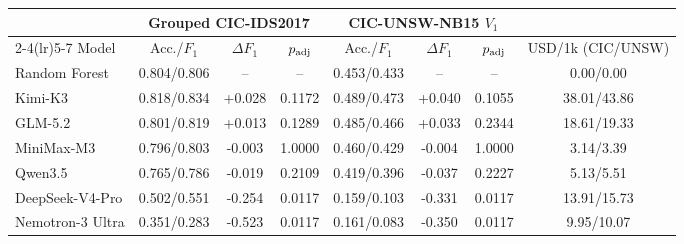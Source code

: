 \begin{tabular}{@{}lccccccc@{}}
\toprule
& \multicolumn{3}{c}{Grouped CIC-IDS2017} & \multicolumn{3}{c}{CIC-UNSW-NB15 $V_1$} & \\
\cmidrule(lr){2-4}\cmidrule(lr){5-7}
Model & Acc./$F_1$ & $\Delta F_1$ & $p_{\rm adj}$ & Acc./$F_1$ & $\Delta F_1$ & $p_{\rm adj}$ & USD/1k (CIC/UNSW) \\
\midrule
Random Forest & 0.804/0.806 & -- & -- & 0.453/0.433 & -- & -- & 0.00/0.00 \\
Kimi-K3 & 0.818/0.834 & +0.028 & 0.1172 & 0.489/0.473 & +0.040 & 0.1055 & 38.01/43.86 \\
GLM-5.2 & 0.801/0.819 & +0.013 & 0.1289 & 0.485/0.466 & +0.033 & 0.2344 & 18.61/19.33 \\
MiniMax-M3 & 0.796/0.803 & -0.003 & 1.0000 & 0.460/0.429 & -0.004 & 1.0000 & 3.14/3.39 \\
Qwen3.5 & 0.765/0.786 & -0.019 & 0.2109 & 0.419/0.396 & -0.037 & 0.2227 & 5.13/5.51 \\
DeepSeek-V4-Pro & 0.502/0.551 & -0.254 & 0.0117 & 0.159/0.103 & -0.331 & 0.0117 & 13.91/15.73 \\
Nemotron-3 Ultra & 0.351/0.283 & -0.523 & 0.0117 & 0.161/0.083 & -0.350 & 0.0117 & 9.95/10.07 \\
\bottomrule
\end{tabular}
